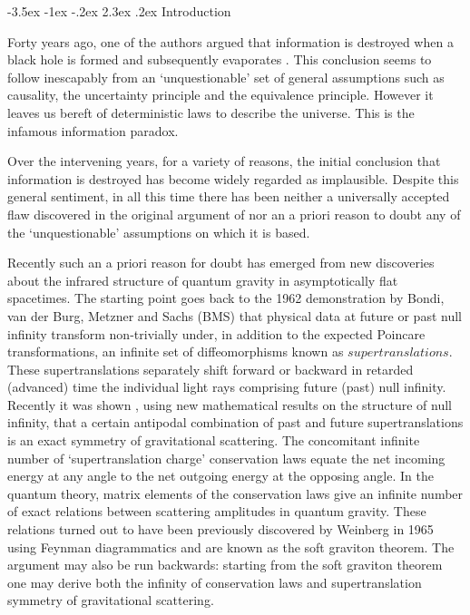 \documentclass[12pt]{article}
\makeatletter
\numberwithin{equation}{section}
\def\p{\partial}
\def\bz{{\bar z}}
\renewcommand\section{\@startsection {section}{1}{\z@}%
                                   {-3.5ex \@plus -1ex \@minus -.2ex}%
                                   {2.3ex \@plus.2ex}%
                                   {\normalfont\large\bfseries}}
\makeatother
\begin{document}
\def\gzz{\gamma_{z\bz}}
\def\gzu{\gamma^{z\bz}}
\def\vx{{\vec x}}
\def\p{\partial}
\def\po{$\cal P_O$}
\def\cN{{\cal N} }
\def\N{${\cal N}~ $}
\def\G{\Gamma}
\def\l{\ell }

\tableofcontents
\section{Introduction}

Forty years ago, one of the authors argued \cite{swh} that information is destroyed when a black hole is formed and subsequently evaporates \cite{Hawking:1974rv,Hawking:1974sw}. This conclusion seems to follow inescapably from an `unquestionable' set of general assumptions
such as causality, the uncertainty principle and the equivalence principle.  However it leaves us bereft of deterministic laws to describe the universe. This is the infamous information paradox. 


Over the intervening years, for a variety of reasons,  the initial conclusion that information is destroyed has become widely regarded as implausible.  Despite this general sentiment, in all this time there has been neither a universally accepted flaw discovered in the  original argument of \cite{swh} nor an a priori reason to doubt any of the `unquestionable' assumptions on which it is based.  

Recently such an a priori reason for doubt has emerged from new discoveries about the infrared structure of quantum gravity  in asymptotically flat spacetimes.  The starting point goes back to the  1962 demonstration by  Bondi, van der Burg, Metzner and Sachs \cite{bms} (BMS) that physical data at future or past null infinity transform non-trivially under, in addition to the expected Poincare transformations, an infinite set of diffeomorphisms known as $supertranslations$. 
These supertranslations separately shift forward or backward in retarded (advanced) time the individual light rays 
comprising future (past) null infinity.  Recently it was shown \cite{Strominger:2013jfa}, using new mathematical results 
\cite{ck} on the structure of null infinity, that a certain antipodal combination of past and future supertranslations is an exact symmetry of gravitational scattering.  The concomitant  infinite number of `supertranslation charge'  conservation laws equate the net 
incoming energy at any angle to the net outgoing energy at the opposing angle. In the quantum theory, matrix elements of the conservation laws give an infinite number of exact relations between scattering amplitudes in quantum gravity. These relations turned out \cite{He:2014laa} to have been previously discovered by Weinberg in 1965 \cite{Weinberg} using Feynman diagrammatics and are known as the soft graviton theorem. The argument may also be run backwards: starting from the soft graviton theorem one may derive both the infinity of conservation laws and supertranslation symmetry of gravitational scattering. 
\end{document}
